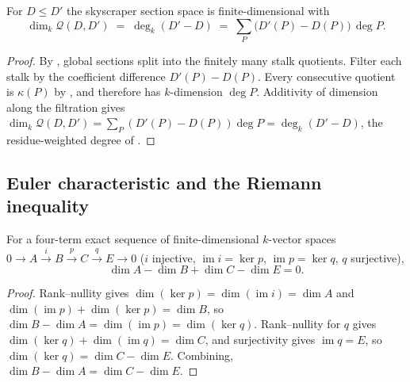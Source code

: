 \begin{proposition}
  \label{thm:adelic_dim_adele_quotient_eq_degree}
  For \(D \le D'\) the skyscraper section space is finite-dimensional
  with
  \[
    \dim_k \mathcal{Q}(D, D')
      \;=\; \deg_k(D' - D)
      \;=\; \sum_P \bigl(D'(P) - D(P)\bigr)\,\deg P .
  \]
\end{proposition}
\begin{proof}
  By , global sections
  split into the finitely many stalk quotients.  Filter each stalk by the
  coefficient difference \(D'(P)-D(P)\).  Every consecutive quotient is
  \(\kappa(P)\) by , and therefore has
  \(k\)-dimension \(\deg P\).  Additivity of dimension along the filtration
  gives
  \(\dim_k \mathcal{Q}(D, D') = \sum_P (D'(P) - D(P))\deg P = \deg_k(D' - D)\),
  the residue-weighted degree of .
\end{proof}

\subsection{Euler characteristic and the Riemann inequality}

\begin{lemma}
  \label{lem:adelic_finrank_alternating_exact4}
  \leanok
  For a four-term exact sequence of finite-dimensional \(k\)-vector
  spaces \(0 \to A \xrightarrow{i} B \xrightarrow{p} C \xrightarrow{q} E
  \to 0\) (\(i\) injective, \(\operatorname{im} i = \ker p\),
  \(\operatorname{im} p = \ker q\), \(q\) surjective),
  \[
    \dim A - \dim B + \dim C - \dim E = 0.
  \]
\end{lemma}
\begin{proof}
  \leanok
  Rank--nullity gives \(\dim(\ker p) = \dim(\operatorname{im} i) = \dim
  A\) and \(\dim(\operatorname{im} p) + \dim(\ker p) = \dim B\), so
  \(\dim B - \dim A = \dim(\operatorname{im} p) = \dim(\ker q)\).
  Rank--nullity for \(q\) gives \(\dim(\ker q) + \dim(\operatorname{im}
  q) = \dim C\), and surjectivity gives \(\operatorname{im} q = E\), so
  \(\dim(\ker q) = \dim C - \dim E\). Combining,
  \(\dim B - \dim A = \dim C - \dim E\).
\end{proof}

